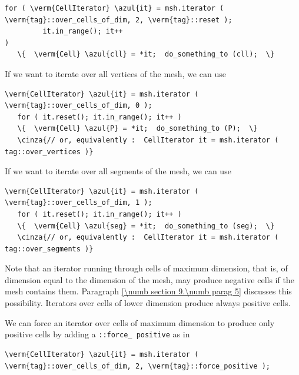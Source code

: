 \begin{Verbatim}[commandchars=\\\{\},formatcom=\small\tt,
   baselinestretch=0.94,framesep=2mm                      ]
   for ( \verm{CellIterator} \azul{it} = msh.iterator ( \verm{tag}::over_cells_of_dim, 2, \verm{tag}::reset );
         it.in_range(); it++                                                       )
   \{  \verm{Cell} \azul{cll} = *it;  do_something_to (cll);  \}
\end{Verbatim}

If we want to iterate over all vertices of the mesh, we can use

\begin{Verbatim}[commandchars=\\\{\},formatcom=\small\tt,
   baselinestretch=0.94,framesep=2mm                      ]
   \verm{CellIterator} \azul{it} = msh.iterator ( \verm{tag}::over_cells_of_dim, 0 );
   for ( it.reset(); it.in_range(); it++ )
   \{  \verm{Cell} \azul{P} = *it;  do_something_to (P);  \}
   \cinza{// or, equivalently :  CellIterator it = msh.iterator ( tag::over_vertices )}
\end{Verbatim}

If we want to iterate over all segments of the mesh, we can use

\begin{Verbatim}[commandchars=\\\{\},formatcom=\small\tt,
   baselinestretch=0.94,framesep=2mm                      ]
   \verm{CellIterator} \azul{it} = msh.iterator ( \verm{tag}::over_cells_of_dim, 1 );
   for ( it.reset(); it.in_range(); it++ )
   \{  \verm{Cell} \azul{seg} = *it;  do_something_to (seg);  \}
   \cinza{// or, equivalently :  CellIterator it = msh.iterator ( tag::over_segments )}
\end{Verbatim}

Note that an iterator running through cells of maximum dimension, that is, of dimension equal
to the dimension of the mesh, may produce negative cells if the mesh contains them.
Paragraph \ref{\numb section 9.\numb parag 5} discusses this possibility.
Iterators over cells of lower dimension produce always positive cells.

We can force an iterator over cells of maximum dimension to produce only positive cells
by adding a {\small\tt {}::force\_\,positive} as in

\begin{Verbatim}[commandchars=\\\{\},formatcom=\small\tt,
   baselinestretch=0.94,framesep=2mm                      ]
   \verm{CellIterator} \azul{it} = msh.iterator ( \verm{tag}::over_cells_of_dim, 2, \verm{tag}::force_positive );
\end{Verbatim}

